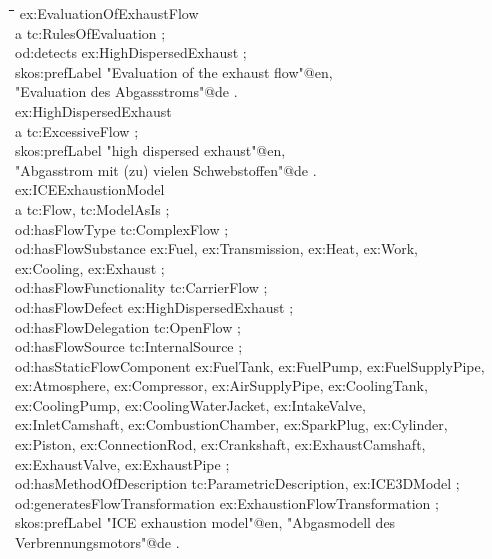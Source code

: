 \documentclass[a4paper,11pt]{article}
\newenvironment{code}{\tt \begin{tabbing}
\hskip12pt\=\hskip12pt\=\hskip12pt\=\hskip12pt\=\hskip5cm\=\hskip5cm\=\kill}
{\end{tabbing}}
\begin{document}
\begin{code}    
ex:EvaluationOfExhaustFlow \\
\> a tc:RulesOfEvaluation ; \\
\> od:detects ex:HighDispersedExhaust ; \\
\> skos:prefLabel "Evaluation of the exhaust flow"@en,\\
\>\> "Evaluation des Abgassstroms"@de . \\[6pt]

ex:HighDispersedExhaust \\
\> a tc:ExcessiveFlow ; \\
\> skos:prefLabel "high dispersed exhaust"@en,\\
\>\> "Abgasstrom mit (zu) vielen Schwebstoffen"@de . \\[6pt]

ex:ICEExhaustionModel \\
\> a tc:Flow, tc:ModelAsIs ; \\
\> od:hasFlowType tc:ComplexFlow ; \\
\> od:hasFlowSubstance ex:Fuel, ex:Transmission, ex:Heat, ex:Work,  \\
\>\> ex:Cooling, ex:Exhaust ; \\
\> od:hasFlowFunctionality tc:CarrierFlow ; \\
\> od:hasFlowDefect ex:HighDispersedExhaust ; \\
\> od:hasFlowDelegation tc:OpenFlow ; \\
\> od:hasFlowSource tc:InternalSource ; \\
\> od:hasStaticFlowComponent ex:FuelTank, ex:FuelPump, ex:FuelSupplyPipe,\+\\
\> ex:Atmosphere, ex:Compressor, ex:AirSupplyPipe, ex:CoolingTank, \\
\> ex:CoolingPump, ex:CoolingWaterJacket, ex:IntakeValve, \\
\> ex:InletCamshaft, ex:CombustionChamber, ex:SparkPlug, ex:Cylinder, \\
\> ex:Piston, ex:ConnectionRod, ex:Crankshaft, ex:ExhaustCamshaft, \\
\> ex:ExhaustValve, ex:ExhaustPipe ; \-\\
\> od:hasMethodOfDescription tc:ParametricDescription, ex:ICE3DModel ; \\
\> od:generatesFlowTransformation ex:ExhaustionFlowTransformation ; \\
\> skos:prefLabel "ICE exhaustion model"@en, "Abgasmodell des
Verbrennungsmotors"@de . \\ 
\end{code}
\end{document}
